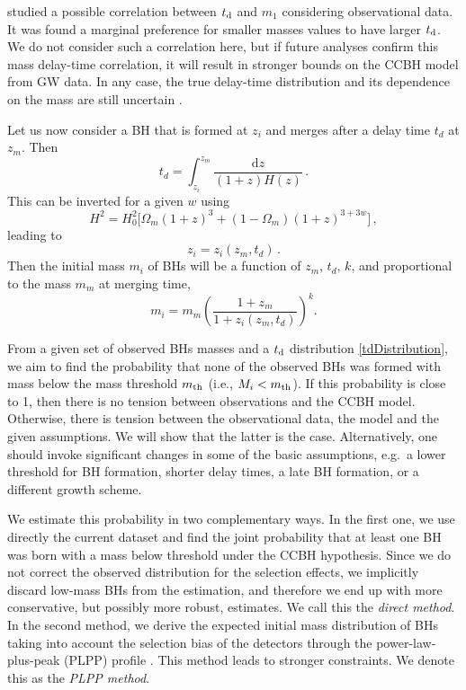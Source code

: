 \documentclass[fleqn,usenatbib,useAMS]{mnras}
\newcommand{\dd}{\textrm{d}}
\begin{document}
\citet{Fishbach:2021mhp} studied a possible correlation between $t_{\rm d}$ and $m_1$ considering observational data. It was found a marginal preference for smaller masses values to have larger $t_{\rm d}$. We do not consider such a correlation here, but if future analyses confirm 
this mass delay-time correlation, it will result in stronger bounds on the CCBH model from GW data.
In any case, the true delay-time distribution and its dependence on the mass are still uncertain \citep[e.g.,][]{vanSon:2021zpk}. 

Let us now consider a BH that is formed at $z_{i}$ and merges after
a delay time $t_{d}$ at $z_{m}$. Then
\begin{equation}
    t_{d}=\int_{z_{i}}^{z_{m}}\frac{\dd z}{(1+z)H(z)} \, . \label{eq:td}
\end{equation}
This can be inverted  for a given $w$ using 
\begin{equation}
    H^{2}=H_{0}^{2}\big[\Omega_{m}(1+z)^{3}+(1-\Omega_{m})(1+z)^{3+3w}\big] \, ,
\end{equation}
leading to
\begin{equation}
    z_{i}=z_{i}(z_{m},t_{d}) \, .
\end{equation}
Then the initial mass $m_i$ of BHs will be a function of $z_{m},\, t_{d}, \, k$, and proportional to the mass $m_m$ at merging time,
\begin{equation} \label{MiMm}
    m_{i}=m_{m}\left(\frac{1+z_{m}}{1+z_{i}(z_{m},t_{d})}\right)^{k}.
\end{equation}

\bigskip

From a given set of observed BHs masses and a $t_{\rm d}$ distribution \eqref{tdDistribution}, we aim to find the probability that none of the observed BHs was formed with mass below {the mass threshold $m_{\rm th}$ (i.e., $M_i < m_{\rm th}$).} If this probability is close to 1, then there is no tension between observations and the CCBH model. Otherwise,  there is tension between the observational data, the model and the given assumptions. We will show that the latter is the case. Alternatively,  one should invoke significant changes in some of the basic assumptions, e.g.~a lower threshold for BH formation, shorter delay times, a late BH formation, or a different growth scheme. 

We estimate this probability in two complementary ways. In the first one, we use directly the current dataset and find the joint probability that at least one BH was born with a mass below threshold under the CCBH hypothesis. Since we do not correct the observed distribution for the selection effects, we implicitly discard low-mass BHs from the estimation, and therefore we end up with more conservative, but possibly more robust, estimates. We call this the {\it direct method}. 
In the second method, we derive the expected initial mass distribution of BHs taking into account the selection bias of the detectors through the power-law-plus-peak (PLPP) profile \citep{LIGOScientific:2020kqk, KAGRA:2021duu}. This method leads to stronger constraints. We denote this as the {\it PLPP method}.
\end{document}

